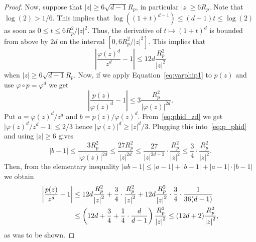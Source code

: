 \documentclass[oneside, 12pt]{amsart}
\newcommand{\abs}[1]{\left\vert#1\right\vert}
\newcommand{\lrpar}[1]{\left(#1\right)}
\theoremstyle{plain}
\theoremstyle{definition}
\numberwithin{equation}{section}       %
\numberwithin{equation}{section}       %
\begin{document}
\begin{proof}
Now, suppose that $\abs{z}\geq 6 \sqrt{d-1} R_p$, in particular $\abs{z}\geq 6R_p$. 
Note that $\log(2)>1/6$.
This implies that $\log((1+t)^{d-1})\leq (d-1) t \leq \log(2)$
as soon as $0\leq t \leq 6R_p^2/\abs{z}^2$. Thus, the derivative of $t\mapsto (1+t)^d$ is bounded from above by $2d$ on the interval $[0,6R_p^2/\abs{z}^2]$. This implies that 
\begin{equation}\label{eq:phid_zd}
\abs{\frac{\varphi(z)^d}{z^d}-1} \leq 12d\frac{R_p^2}{\abs{z}^2}
\end{equation}
when  $\abs{z}\geq 6 \sqrt{d-1} R_p$. Now, if we apply Equation~\eqref{eq:varphip1} to $p(z)$ and use $\varphi\circ p=\varphi^d$ we get 
\begin{equation}\label{eq:p_phid}
\abs{\frac{p(z)}{\varphi(z)^d}-1}\leq 3 \frac{R_p^2}{\abs{\varphi(z)}^{2d}}.
\end{equation}
 Put $a= \varphi(z)^d/z^d$ and $b   = p(z)/\varphi(z)^d$. From~\eqref{eq:phid_zd} 
we get $\vert \varphi(z)^d/{z}^d -1\vert\leq 2/3$ hence 
$ \abs{\varphi (z)}^d   \geq \abs{z}^d/3$. Plugging this into~\eqref{eq:p_phid} and using $\abs{z}\geq 6$ gives 
\begin{equation}
\abs{b-1} \leq \frac{3 R_p ^2}{\abs{\varphi(z)}^{2d}} \leq \frac{27 R_p^2}{\abs{z}^{2d}} \leq \frac{27}{\abs{z}^{2d-2}} \cdot \frac{R_p^2}{\abs{z}^2} \leq \frac{3}{4} \cdot \frac{R_p^2}{\abs{z}^2} . 
\end{equation}
Then, from the elementary inequality $\abs{ab-1}\leq \abs{a - 1}+  \abs{b-1}+\abs{a-1}\cdot \abs{b-1}$
we obtain 
\begin{align}
\abs{\frac{p(z)}{z^d}- 1 }&\leq 12d \frac{R_p^2}{\abs{z}^2} + \frac{3}{4} \cdot \frac{R_p^2}{\abs{z}^2} + 12d \frac{R_p^2}{\abs{z}^2} \cdot \frac{3}{4}\cdot \frac{1}{36(d-1)} \\ \notag
& \leq \lrpar{12d + \frac34 + \frac14\cdot \frac{d}{d-1}} \frac{R_p^2}{\abs{z}^2} \leq (12d+2) \frac{R_p^2}{\abs{z}^2},
\end{align}
as was to be shown. 


\end{proof}
\end{document}
